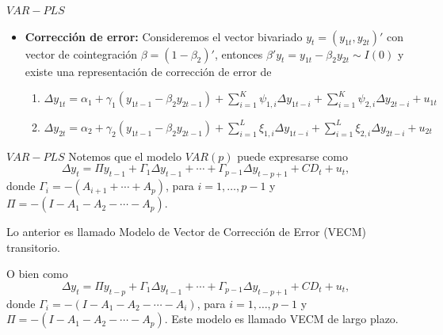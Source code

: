 \documentclass{beamer}
\newcommand{\?}{?`}
\begin{document}
\begin{frame}{$VAR-PLS$}
  \begin{itemize}
  \item \textbf{Correcci\'on de error: } Consideremos el vector bivariado
    $y_t=(y_{1t},y_{2t})'$ con vector de cointegraci\'on
    $\beta=(1-\beta_2)'$, entonces $\beta'y_t=y_{1t}-\beta_2y_{2t}\sim
    I(0)$ y existe una representaci\'on de correcci\'on de error de
    \begin{enumerate}
    \item $\Delta y_{1t}=\alpha_1+\gamma_1(y_{1t-1}-\beta_2y_{2t-1})+
      \sum_{i=1}^K \psi_{1,i}\Delta y_{1t-i} + \sum_{i=1}^K
      \psi_{2,i}\Delta y_{2t-i} + u_{1t}$ 
    \item $\Delta y_{2t}=\alpha_2+\gamma_2(y_{1t-1}-\beta_2y_{2t-1})+
      \sum_{i=1}^L \xi_{1,i}\Delta y_{1t-i} + \sum_{i=1}^L
      \xi_{2,i}\Delta y_{2t-i} + u_{2t}$ 
    \end{enumerate}
  \end{itemize}
  
\end{frame}

\begin{frame}{$VAR-PLS$}
  Notemos que el modelo $VAR(p)$ puede expresarse como
  \begin{displaymath}
    \Delta y_{t}=\Pi y_{t-1}+\Gamma_1 \Delta y_{t-1} + \cdots +
    \Gamma_{p-1} \Delta y_{t-p+1} + CD_t + u_t,
  \end{displaymath}
  donde $\Gamma_i=-(A_{i+1}+\cdots + A_p)$, para $i=1,\ldots ,p-1$ y
  $\Pi=-(I-A_1-A_2-\cdots - A_p)$. 

  Lo anterior es llamado Modelo de
  Vector de Correcci\'on de Error (VECM) transitorio.

  O bien como
  \begin{displaymath}
    \Delta y_t=\Pi y_{t-p}+\Gamma_1 \Delta y_{t-1} + \cdots +
    \Gamma_{p-1} \Delta y_{t-p+1} + CD_t + u_t,
  \end{displaymath}
  donde $\Gamma_i=-(I-A_{1}-A_2-\cdots -A_i)$, para $i=1,\ldots ,p-1$
  y $\Pi=-(I-A_1-A_2-\cdots - A_p)$. Este modelo es llamado VECM de
  largo plazo.

\end{frame}
\end{document}
